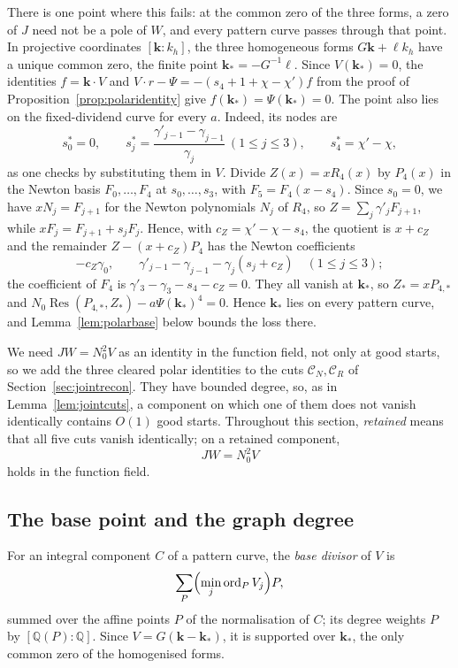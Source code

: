 \documentclass[11pt]{article}
\theoremstyle{definition}
\theoremstyle{remark}
\begin{document}
There is one point where this fails: at the common zero of the three forms,
a zero of $J$ need not be a pole of $W$, and every pattern curve passes
through that point. In projective coordinates $[\mathbf k:k_h]$, the three homogeneous forms
$G\mathbf k+\ell k_h$ have a unique common zero, the finite point
$\mathbf k_*=-G^{-1}\ell$. Since $V(\mathbf k_*)=0$, the identities $f=\mathbf k\cdot V$
and $V\cdot r-\Psi=-(s_4+1+\chi-\chi')f$ from the proof of
Proposition~\ref{prop:polaridentity} give $f(\mathbf k_*)=\Psi(\mathbf k_*)=0$. The
point also lies on the fixed-dividend curve for every $a$. Indeed, its nodes are
\[
 s_0^*=0,\qquad
 s_j^*=\frac{\gamma'_{j-1}-\gamma_{j-1}}{\gamma_j}\ (1\le j\le3),
 \qquad s_4^*=\chi'-\chi,
\]
as one checks by substituting them in $V$. Divide $Z(x)=x R_4(x)$ by $P_4(x)$
in the Newton basis $F_0,\dots,F_4$ at $s_0,\dots,s_3$, with $F_5=F_4(x-s_4)$.
Since $s_0=0$, we have $xN_j=F_{j+1}$ for the Newton polynomials $N_j$ of $R_4$,
so $Z=\sum_j\gamma'_jF_{j+1}$, while $xF_j=F_{j+1}+s_jF_j$. Hence, with
$c_Z=\chi'-\chi-s_4$, the quotient is $x+c_Z$ and the remainder
$Z-(x+c_Z)P_4$ has the Newton coefficients
\[
 -c_Z\gamma_0,\qquad
 \gamma'_{j-1}-\gamma_{j-1}-\gamma_j(s_j+c_Z)\quad(1\le j\le3);
\]
the coefficient of $F_4$ is $\gamma'_3-\gamma_3-s_4-c_Z=0$.
They all vanish at $\mathbf k_*$, so $Z_*=x P_{4,*}$ and
$N_0\operatorname{Res}(P_{4,*},Z_*)-a\Psi(\mathbf k_*)^4=0$. Hence $\mathbf k_*$ lies
on every pattern curve, and Lemma~\ref{lem:polarbase} below bounds the loss there.

We need $JW=N_0^2V$ as an identity in the function field, not only at good
starts, so we add the three cleared polar identities to the cuts
$\mathcal C_N,\mathcal C_R$ of Section~\ref{sec:jointrecon}. They have bounded degree, so, as in
Lemma~\ref{lem:jointcuts}, a component on which one of them does not vanish
identically contains $O(1)$ good starts. Throughout this section, \emph{retained}
means that all five cuts vanish identically; on a retained component,
\[
 JW=N_0^2V
\]
holds in the function field.

\subsection{The base point and the graph degree}

For an integral component $C$ of a pattern curve, the \emph{base divisor} of
$V$ is
\[
 \sum_P\Bigl(\min_j\operatorname{ord}_PV_j\Bigr)P,
\]
summed over the affine points $P$ of the normalisation of $C$; its degree
weights $P$ by $[\mathbb Q(P):\mathbb Q]$. Since
$V=G(\mathbf k-\mathbf k_*)$, it is supported over $\mathbf k_*$,
the only common zero of the homogenised forms.
\end{document}
